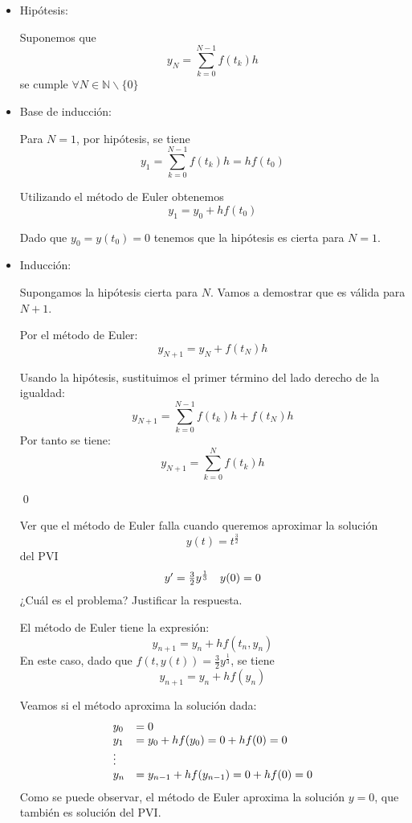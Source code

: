 \begin{itemize}
\item Hipótesis:

Suponemos que $$y_N=\sum_{k=0}^{N-1}f(t_k)h$$
se cumple $\forall N\in \mathbb{N}\backslash \{ 0 \}$

\item Base de inducción: 

Para $N=1$, por hipótesis, se tiene $$y_1=\sum_{k=0}^{N-1}f(t_k)h = hf(t_0)$$

Utilizando el método de Euler obtenemos $$y_1 = y_0 + hf(t_0)$$

Dado que $y_0 = y(t_0) = 0$ tenemos que la hipótesis es cierta para $N=1$.

\item Inducción:

Supongamos la hipótesis cierta para $N$. Vamos a demostrar que es válida para $N+1$.

Por el método de Euler:
$$y_{N+1}=y_{N}+f(t_{N})h$$

Usando la hipótesis, sustituimos el primer término del lado derecho de la igualdad:
$$y_{N+1}=\sum_{k=0}^{N-1}f(t_k)h+f(t_{N})h$$
Por tanto se tiene:
$$y_{N+1}=\sum_{k=0}^{N}f(t_k)h$$

\qed


\begin{mathproblem}{2}
Ver que el método de Euler falla cuando queremos aproximar la solución
$$y(t) = t^{\frac{3}{2}}$$
del PVI
\begin{equation*}
\begin{array}{c c}
y' = \frac{3}{2}y^{\frac{1}{3}} &
y(0) = 0
\end{array}
\end{equation*}
¿Cuál es el problema? Justificar la respuesta.
\end{mathproblem}
El método de Euler tiene la expresión:
$$y_{n+1} = y_n + hf(t_n, y_n)$$
En este caso, dado que $f(t, y(t)) = \frac{3}{2}y^{\frac{1}{3}}$, se tiene 
$$y_{n+1} = y_n + hf(y_n)$$

Veamos si el método aproxima la solución dada:
\begin{equation*}
\begin{array}{l l}
y_0 & = 0\\
y_1 & = y_0 + hf(y_0) = 0 + hf(0) = 0\\
\vdots & \\
y_n & = y_{n-1} + hf(y_{n-1}) = 0 + hf(0) = 0
\end{array}
\end{equation*}
Como se puede observar, el método de Euler aproxima la solución $y = 0$, que también es solución del PVI.


\end{itemize}
